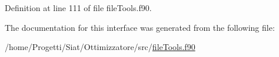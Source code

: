 Definition at line 111 of file file\-Tools.\-f90.



The documentation for this interface was generated from the following file\-:\begin{DoxyCompactItemize}
\item 
/home/\-Progetti/\-Siat/\-Ottimizzatore/src/\hyperlink{file_tools_8f90}{file\-Tools.\-f90}\end{DoxyCompactItemize}
